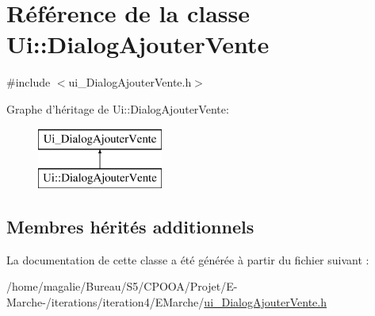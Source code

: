 \hypertarget{class_ui_1_1_dialog_ajouter_vente}{\section{Référence de la classe Ui\-:\-:Dialog\-Ajouter\-Vente}
\label{class_ui_1_1_dialog_ajouter_vente}
}


{\ttfamily \#include $<$ui\-\_\-\-Dialog\-Ajouter\-Vente.\-h$>$}

Graphe d'héritage de Ui\-:\-:Dialog\-Ajouter\-Vente\-:\begin{figure}[H]
\begin{center}
\leavevmode
\includegraphics[height=2.000000cm]{class_ui_1_1_dialog_ajouter_vente}
\end{center}
\end{figure}
\subsection*{Membres hérités additionnels}


La documentation de cette classe a été générée à partir du fichier suivant \-:\begin{DoxyCompactItemize}
\item 
/home/magalie/\-Bureau/\-S5/\-C\-P\-O\-O\-A/\-Projet/\-E-\/\-Marche-\//iterations/iteration4/\-E\-Marche/\hyperlink{ui___dialog_ajouter_vente_8h}{ui\-\_\-\-Dialog\-Ajouter\-Vente.\-h}\end{DoxyCompactItemize}
